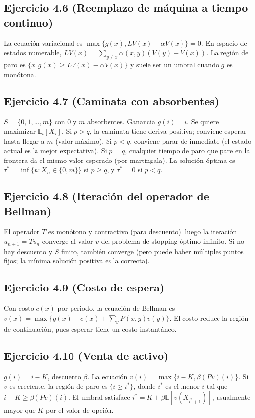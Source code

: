 \documentclass[letterpaper, 12pt]{article}
\newcommand{\E}{\mathbb{E}}
\newcommand{\1}{\mathbbm{1}}
\begin{document}
    \subsection{Ejercicio 4.6 (Reemplazo de m\'aquina a tiempo continuo)}
    La ecuaci\'on variacional es $\max\{g(x), LV(x)-\alpha V(x)\}=0$. En espacio de estados numerable, $LV(x)=\sum_{y\neq x}\alpha(x,y)(V(y)-V(x))$. La regi\'on de paro es $\{x:g(x)\ge LV(x)-\alpha V(x)\}$ y suele ser un umbral cuando $g$ es mon\'otona.

    \subsection{Ejercicio 4.7 (Caminata con absorbentes)}
    $S=\{0,1,\dots,m\}$ con $0$ y $m$ absorbentes. Ganancia $g(i)=i$. Se quiere maximizar $\E_i[X_\tau]$. Si $p>q$, la caminata tiene deriva positiva; conviene esperar hasta llegar a $m$ (valor m\'aximo). Si $p<q$, conviene parar de inmediato (el estado actual es la mejor expectativa). Si $p=q$, cualquier tiempo de paro que pare en la frontera da el mismo valor esperado (por martingala). La soluci\'on \'optima es $\tau^*=\inf\{n:X_n\in\{0,m\}\}$ si $p\ge q$, y $\tau^*=0$ si $p<q$.

    \subsection{Ejercicio 4.8 (Iteraci\'on del operador de Bellman)}
    El operador $T$ es mon\'otono y contractivo (para descuento), luego la iteraci\'on $u_{n+1}=Tu_n$ converge al valor $v$ del problema de stopping \'optimo infinito. Si no hay descuento y $S$ finito, tambi\'en converge (pero puede haber m\'ultiples puntos fijos; la m\'inima soluci\'on positiva es la correcta).

    \subsection{Ejercicio 4.9 (Costo de espera)}
    Con costo $c(x)$ por periodo, la ecuaci\'on de Bellman es $v(x)=\max\{g(x), -c(x)+\sum_y P(x,y)v(y)\}$. El costo reduce la regi\'on de continuaci\'on, pues esperar tiene un costo instant\'aneo.

    \subsection{Ejercicio 4.10 (Venta de activo)}
    $g(i)=i-K$, descuento $\beta$. La ecuaci\'on $v(i)=\max\{i-K,\beta(Pv)(i)\}$. Si $v$ es creciente, la regi\'on de paro es $\{i\ge i^*\}$, donde $i^*$ es el menor $i$ tal que $i-K\ge\beta(Pv)(i)$. El umbral satisface $i^*=K+\beta\E[v(X_{i^*+1})]$, usualmente mayor que $K$ por el valor de opci\'on.
\end{document}
